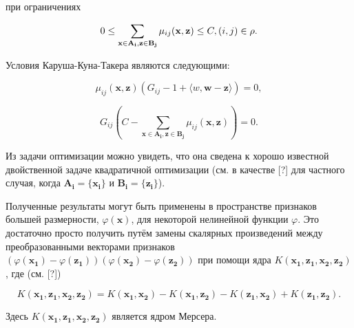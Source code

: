 \documentclass[12pt,a4paper,oneside]{article}
\begin{document}
\par
при ограничениях

\[
0 \leq \sum \limits_{\mathbf{x} \in \mathbf{A_i}, \mathbf{z} \in \mathbf{B_j}} \mu_{ij} (\mathbf{x}, \mathbf{z}) \leq C, (i, j) \in \mathrm{\rho}.
\]

\par
Условия Каруша-Куна-Такера являются следующими:

\[
\mu_{ij} (\mathbf{x}, \mathbf{z}) (G_{ij} - 1 + \langle w, \mathbf{w} - \mathbf{z} \rangle) = 0,
\]

\[
G_{ij} (C - \sum \limits_{\mathbf{x} \in \mathbf{A_i}, \mathbf{z} \in \mathbf{B_j}} \mu_{ij} (\mathbf{x}, \mathbf{z})) = 0.
\]

\par
Из задачи оптимизации можно увидеть, что она сведена к хорошо известной двойственной задаче квадратичной оптимизации (см. в качестве [?] для частного случая, когда \(\mathbf{A_i} = \{\mathbf{x_i}\}\) и \(\mathbf{B_i} = \{\mathbf{z_i}\}\)). 

\par
Полученные результаты могут быть применены в пространстве признаков большей размерности, \(\varphi(\mathbf{x})\), для некоторой нелинейной функции \(\varphi\). 
Это достаточно просто получить путём замены скалярных произведений между преобразованными векторами признаков \((\varphi(\mathbf{x_1}) - \varphi(\mathbf{z_1})) (\varphi(\mathbf{x_2}) - \varphi(\mathbf{z_2}))\) при помощи ядра \(K(\mathbf{x_1}, \mathbf{z_1}, \mathbf{x_2}, \mathbf{z_2})\), где (см. [?])

\[
K(\mathbf{x_1}, \mathbf{z_1}, \mathbf{x_2}, \mathbf{z_2}) = K(\mathbf{x_1}, \mathbf{x_2}) - K(\mathbf{x_1}, \mathbf{z_2}) - K(\mathbf{z_1}, \mathbf{x_2}) + K(\mathbf{z_1}, \mathbf{z_2}).
\]

\par
Здесь \(K(\mathbf{x_1}, \mathbf{z_1}, \mathbf{x_2}, \mathbf{z_2})\) является ядром Мерсера. 


\end{document}
